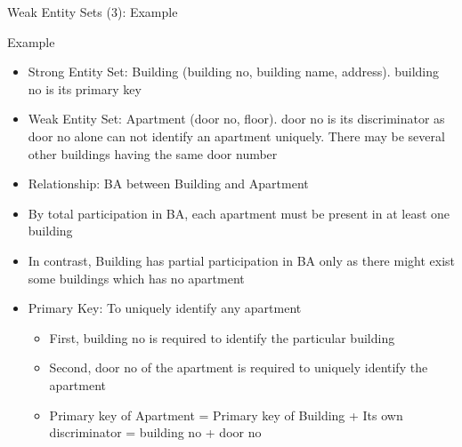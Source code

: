 \documentclass[aspectratio=169, xcolor=dvipsnames]{beamer}
\begin{document}
\begin{frame}{Weak Entity Sets (3): Example}
    \begin{exampleblock}{Example}
        \begin{itemize}[<+->]
            \item Strong Entity Set: Building (building no, building name, address). building no is its primary key
            \item Weak Entity Set: Apartment (door no, floor). door no is its discriminator as door no alone can not identify an apartment uniquely. There may be several other buildings having the same door number
            \item Relationship: BA between Building and Apartment
            \item By total participation in BA, each apartment must be present in at least one building
            \item In contrast, Building has partial participation in BA only as there might exist some buildings which has no apartment
            \item Primary Key: To uniquely identify any apartment
            \begin{itemize}
                \item[$\triangleright$] First, building no is required to identify the particular building
                \item[$\triangleright$] Second, door no of the apartment is required to uniquely identify the apartment
                \item[$\triangleright$] Primary key of Apartment = Primary key of Building + Its own discriminator = building no + door no
            \end{itemize}
        \end{itemize}
    \end{exampleblock}
\end{frame}
\end{document}
